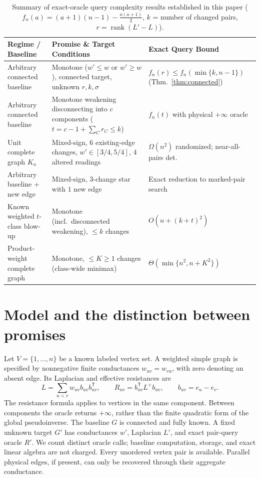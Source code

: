 \documentclass[11pt,letterpaper]{article}
\begin{document}
\begin{table}[!htbp]
\centering
\caption{Summary of exact-oracle query complexity results established in this paper ($f_n(a)=(a+1)(n-1)-\frac{a(a+1)}{2}$, $k$ = number of changed pairs, $r=\operatorname{rank}(L'-L)$).}
\label{tab:summary}
\small
\begin{tabularx}{\linewidth}{@{}l X l@{}}
\toprule
\textbf{Regime / Baseline} & \textbf{Promise \& Target Conditions} & \textbf{Exact Query Bound} \\
\midrule
Arbitrary connected baseline & Monotone ($w'\le w$ or $w'\ge w$), connected target, unknown $r,k,\sigma$ & $f_n(r) \le f_n(\min\{k,n-1\})$ (Thm.~\ref{thm:connected}) \\
Arbitrary connected baseline & Monotone weakening disconnecting into $c$ components ($t=c-1+\sum_C r_C\le k$) & $f_n(t)$ with physical $+\infty$ oracle \\
Unit complete graph $K_n$ & Mixed-sign, $6$ existing-edge changes, $w'\in[3/4,5/4]$, $4$ altered readings & $\Omega(n^2)$ randomized; near-all-pairs det. \\
Arbitrary baseline + new edge & Mixed-sign, $3$-change star with $1$ new edge & Exact reduction to marked-pair search \\
Known weighted $t$-class blow-up & Monotone (incl.\ disconnected weakening), $\le k$ changes & $O(n + (k+t)^2)$ \\
Product-weight complete graph & Monotone, $\le K\ge 1$ changes (class-wide minimax) & $\Theta(\min\{n^2, n+K^2\})$ \\
\bottomrule
\end{tabularx}
\end{table}

\section{Model and the distinction between promises}
Let $V=\{1,\ldots,n\}$ be a known labeled vertex set. A weighted simple graph is specified by nonnegative finite conductances $w_{uv}=w_{vu}$, with zero denoting an absent edge. Its Laplacian and effective resistances are
\[
 L=\sum_{u<v}w_{uv}b_{uv}b_{uv}^{\mathsf T},\qquad
 R_{uv}=b_{uv}^{\mathsf T}L^+b_{uv},\qquad b_{uv}=e_u-e_v.
\]
The resistance formula applies to vertices in the same component. Between components the oracle returns $+\infty$, rather than the finite quadratic form of the global pseudoinverse. The baseline $G$ is connected and fully known. A fixed unknown target $G'$ has conductances $w'$, Laplacian $L'$, and exact pair-query oracle $R'$. We count distinct oracle calls; baseline computation, storage, and exact linear algebra are not charged. Every unordered vertex pair is available. Parallel physical edges, if present, can only be recovered through their aggregate conductance.
\end{document}
